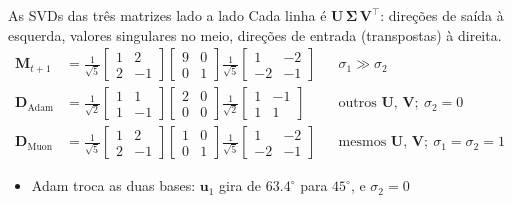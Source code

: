 \documentclass[aspectratio=169,xcolor=dvipsnames]{beamer}
\begin{document}
  \begin{frame}{As SVDs das três matrizes lado a lado}
    Cada linha é $\mathbf{U}\,\boldsymbol{\Sigma}\,\mathbf{V}^{\top}$: direções de saída à esquerda, valores
    singulares no meio, direções de entrada (transpostas) à direita.
    \small
    \begin{align*}
      \mathbf{M}_{t+1}
        &=\tfrac{1}{\sqrt{5}}\begin{bmatrix}1&2\\2&-1\end{bmatrix}
          \begin{bmatrix}9&0\\0&1\end{bmatrix}
          \tfrac{1}{\sqrt{5}}\begin{bmatrix}1&-2\\-2&-1\end{bmatrix}
        &&\sigma_1\gg\sigma_2\\
      \mathbf{D}_{\text{Adam}}
        &=\tfrac{1}{\sqrt{2}}\begin{bmatrix}1&1\\1&-1\end{bmatrix}
          \begin{bmatrix}2&0\\0&0\end{bmatrix}
          \tfrac{1}{\sqrt{2}}\begin{bmatrix}1&-1\\1&1\end{bmatrix}
        &&\text{outros } \mathbf{U},\,\mathbf{V};\ \sigma_2=0\\
      \mathbf{D}_{\text{Muon}}
        &=\tfrac{1}{\sqrt{5}}\begin{bmatrix}1&2\\2&-1\end{bmatrix}
          \begin{bmatrix}1&0\\0&1\end{bmatrix}
          \tfrac{1}{\sqrt{5}}\begin{bmatrix}1&-2\\-2&-1\end{bmatrix}
        &&\text{mesmos } \mathbf{U},\,\mathbf{V};\ \sigma_1=\sigma_2=1
    \end{align*}
    \normalsize
    \begin{itemize}
      \item Adam troca as duas bases: $\mathbf{u}_1$ gira de $63.4^{\circ}$ para $45^{\circ}$, e $\sigma_2=0$

\end{itemize}
\end{frame}
\end{document}
